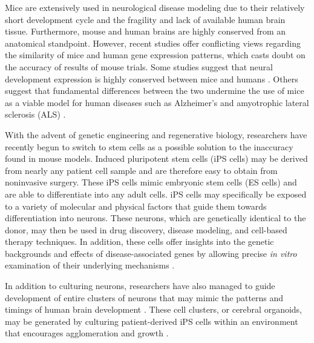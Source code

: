 \documentclass[12pt,oneside,onecolumn,a4paper]{article}
\begin{document}
Mice are extensively used in neurological disease modeling due to their relatively short development cycle and the fragility and lack of available human brain tissue. Furthermore, mouse and human brains are highly conserved from an anatomical standpoint. However, recent studies offer conflicting views regarding the similarity of mice and human gene expression patterns, which casts doubt on the accuracy of results of mouse trials. Some studies suggest that neural development expression is highly conserved between mice and humans \citep{Lin_2014}. Others suggest that fundamental differences between the two undermine the use of mice as a viable model for human diseases such as Alzheimer's and amyotrophic lateral sclerosis (ALS) \citep{Burns_2015}.

With the advent of genetic engineering and regenerative biology, researchers have recently begun to switch to stem cells as a possible solution to the inaccuracy found in mouse models. Induced pluripotent stem cells
(iPS cells) may be derived from nearly any patient cell sample and are therefore easy to obtain from noninvasive surgery. These iPS cells mimic embryonic stem cells (ES cells) and are able to differentiate into any adult cells. iPS cells may specifically be exposed to a variety of molecular and physical factors that guide them towards differentiation into neurons. These neurons, which are genetically identical to the donor, may then be used in drug discovery, disease modeling, and cell-based therapy techniques. In addition, these cells offer insights into the genetic backgrounds and effects of disease-associated genes by allowing precise \textit{in vitro} examination of their underlying mechanisms \citep{Imaizumi2014ModelingHN}.

In addition to culturing neurons, researchers have also managed to guide development of entire clusters of neurons that may mimic the patterns and timings of human brain development \citep{Lancaster_2014}. These cell clusters, or cerebral organoids, may be generated by culturing patient-derived iPS cells within an environment that encourages agglomeration and growth \citep{nguyen_wang_nikolakopoulou_2015}. 
\end{document}
